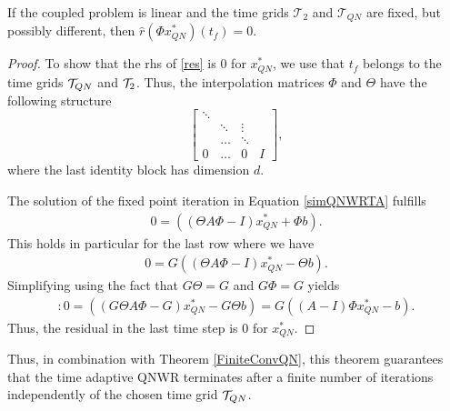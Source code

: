 \begin{theorem}\label{QNWRTATerm}
  If the coupled problem is linear and the time grids $\mathcal{T}_2$ and $\mathcal{T}_{QN}$ are fixed, but possibly different, then $\hat{r}(\Phi x_{QN}^*)(t_f)=0$.
\end{theorem}

\begin{proof}
To show that the rhs of \eqref{res} is 0 for $x_{QN}^{*}$, we use that $t_f$ belongs to the time grids ${\cal T}_{QN}$ and ${\cal T}_2$. Thus, the interpolation matrices $\Phi$ and $\Theta$ have the following structure
\begin{equation*}
	\begin{bmatrix}
		\ddots &  & &   \\
		& \ddots & \vdots&   \\
		& \dots & \ddots &  \\
		0 & \dots & 0 & I
	\end{bmatrix},
\end{equation*}
where the last identity block has dimension $d$. 
	
The solution of the fixed point iteration in Equation \eqref{simQNWRTA} fulfills
\begin{align*}
	0 = ((\Theta A \Phi - I) x^*_{QN} + \Phi b).
\end{align*}
This holds in particular for the last row where we have
\begin{align*}
	0 = G \left( \left(\Theta A \Phi - I \right) x^*_{QN} - \Theta b \right).
\end{align*}
Simplifying using the fact that $G \Theta = G$ and $G \Phi = G$ yields
\begin{align*}:
0 =  \left( \left(G\Theta A \Phi - G \right) x_{QN}^* - G \Theta b \right) = G \left( (A-I)\Phi x_{QN}^* - b \right).
\end{align*}
Thus, the residual in the last time step is $0$ for $x^{*}_{QN}$. 
\end{proof}

Thus, in combination with Theorem \ref{FiniteConvQN}, this theorem guarantees that the time adaptive QNWR terminates after a finite number of iterations independently of the chosen time grid ${\cal T}_{QN}$.
